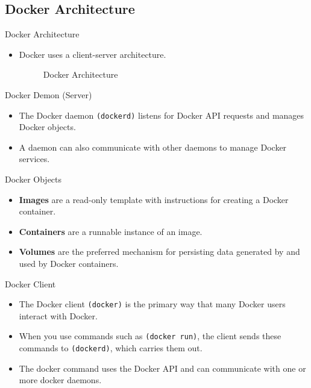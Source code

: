 \subsection{Docker Architecture}\label{subsec:docker-architecture}
\begin{frame}{Docker Architecture}
    \begin{itemize}
        \item Docker uses a client-server architecture.
        \linebreak
        \pause
        \begin{figure}[!t]
            \raggedright
            
            \caption{Docker Architecture}
        \end{figure}
    \end{itemize}
\end{frame}
\begin{frame}{Docker Demon (Server)}
    \begin{itemize}[<+- | alert@+>]
        \item The Docker daemon \texttt{(dockerd)} listens for Docker API requests and manages Docker objects.
        \item A daemon can also communicate with other daemons to manage Docker services.
    \end{itemize}
\end{frame}
\begin{frame}{Docker Objects}
    \begin{itemize}[<+- | alert@+>]
        \item \textbf{Images} are a read-only template with instructions for creating a Docker container.
        \item \textbf{Containers} are a runnable instance of an image.
        \item \textbf{Volumes} are the preferred mechanism for persisting data generated by and used by Docker containers.
    \end{itemize}
\end{frame}
\begin{frame}{Docker Client}
    \begin{itemize}[<+- | alert@+>]
        \item The Docker client \texttt{(docker)} is the primary way that many Docker users interact with Docker.
        \item When you use commands such as \texttt{(docker run)}, the client sends these commands to \texttt{(dockerd)}, which carries them out.
        \item The docker command uses the Docker API and can communicate with one or more docker daemons.
    \end{itemize}
\end{frame}
